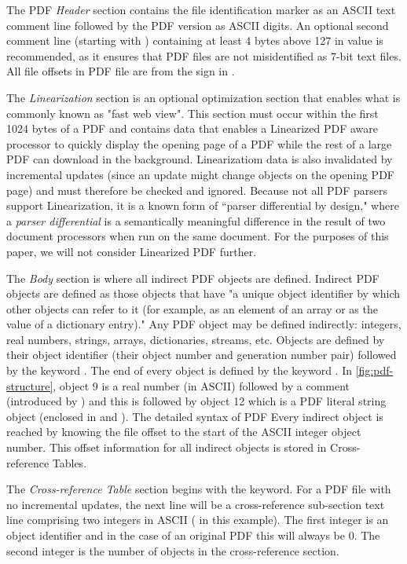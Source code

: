 The PDF \emph{Header} section contains the file identification marker as an ASCII
text comment line  followed by the PDF version as ASCII digits. 
An optional second comment line (starting with \lstcd{\%})
containing at least 4 bytes above 127 in value is recommended, as it ensures 
that PDF files are not misidentified as 7-bit text files. 
All file offsets in PDF file are from the \lstcd{\%} sign in .  

The \emph{Linearization} section is an optional optimization section that enables what is commonly
known as "fast web view". This section must occur within the first 1024 bytes of a PDF and contains
data that enables a Linearized PDF aware processor to quickly display the opening page of a PDF
while the rest of a large PDF can download in the background.
Linearizatiom data is also invalidated by incremental updates (since an update might change objects
on the opening PDF page) and must therefore be checked and ignored.
%
Because not all PDF parsers support Linearization, it is a known form
of ``parser differential by design," where a \emph{parser
  differential} is a semantically meaningful difference in the result
of two document processors when run on the same document.
%
For the purposes of this paper, we will not consider Linearized PDF further.

The \emph{Body} section is where all indirect PDF objects are defined. Indirect PDF objects
are defined as those objects that have "a unique object identifier by which other objects can
refer to it (for example, as an element of an array or as the value of a dictionary entry)."
Any PDF object may be defined indirectly: integers, real numbers, strings, arrays, dictionaries, 
streams, etc. Objects are defined by their object identifier (their object number and generation 
number pair) followed by the keyword . 
The end of every object is defined by the keyword .
In \cref{fig:pdf-structure}, object 9 is a real number (in ASCII) followed by a comment
(introduced by \lstcd{\%}) and this is followed by object 12 which is a PDF literal string object
(enclosed in \lstcd{(} and \lstcd{)}). The detailed syntax of PDF  
Every indirect object is reached by knowing the file offset to the start of the ASCII integer 
object number. This offset information for all indirect objects is stored in Cross-reference Tables.

The \emph{Cross-reference Table} section begins with the  keyword. For a PDF file
with no incremental updates, the next line will be a cross-reference sub-section text line comprising
two integers in ASCII ( in this example). The first integer is an object identifier 
and in the case of an original PDF this will always be 0. The second integer is the number of
objects in the cross-reference section.

